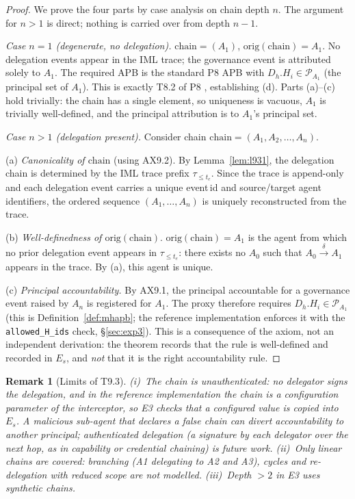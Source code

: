 \documentclass[11pt]{article}
\newtheorem{remark}{Remark}[section]
\newcommand{\Pset}{\mathcal{P}}
\newcommand{\Es}{E_s}
\newcommand{\Dh}{D_h}
\newcommand{\Hi}{H_i}
\newcommand{\delegateto}{\xrightarrow{\delta}}
\newcommand{\chain}{\mathrm{chain}}
\newcommand{\orig}{\mathrm{orig}}
\begin{document}
\begin{proof}
We prove the four parts by case analysis on chain depth $n$. The
argument for $n>1$ is direct; nothing is carried over from depth $n-1$.

\emph{Case $n = 1$ (degenerate, no delegation).}
$\chain = (A_1)$, $\orig(\chain) = A_1$.
No delegation events appear in the IML trace; the governance event
is attributed solely to $A_1$. The required APB is the standard P8
APB with $\Dh.\Hi \in \Pset_{A_1}$ (the principal set of $A_1$).
This is exactly T8.2 of P8 \citep{fernandez2026ibg}, establishing (d).
Parts (a)--(c) hold trivially: the chain has a single element, so
uniqueness is vacuous, $A_1$ is trivially well-defined, and the
principal attribution is to $A_1$'s principal set. \checkmark

\emph{Case $n > 1$ (delegation present).}
Consider chain $\chain = (A_1, A_2, \ldots, A_n)$.

(a) \emph{Canonicality of $\chain$} (using AX9.2).
By Lemma~\ref{lem:l931}, the delegation chain is determined by the
IML trace prefix $\tau_{\le t_e}$. Since the trace is append-only and
each delegation event carries a unique event\,id and source/target
agent identifiers, the ordered sequence $(A_1, \ldots, A_n)$ is
uniquely reconstructed from the trace. \checkmark

(b) \emph{Well-definedness of $\orig(\chain)$}.
$\orig(\chain) = A_1$ is the agent from which no prior delegation
event appears in $\tau_{\le t_e}$: there exists no $A_0$ such
that $A_0 \delegateto A_1$ appears in the trace.
By (a), this agent is unique. \checkmark

(c) \emph{Principal accountability.}
By AX9.1, the principal accountable for a governance event raised by
$A_n$ is registered for $A_1$. The proxy therefore requires
$\Dh.\Hi \in \Pset_{A_1}$ (this is Definition~\ref{def:mhapb}; the
reference implementation enforces it with the
\texttt{allowed\_H\_ids} check, \S\ref{sec:exp3}). This is a
consequence of the axiom, not an independent derivation: the theorem
records that the rule is well-defined and recorded in $\Es$, and
\emph{not} that it is the right accountability rule. \checkmark
\end{proof}

\begin{remark}[Limits of T9.3]
(i)~The chain is \emph{unauthenticated}: no delegator signs the
delegation, and in the reference implementation the chain is a
configuration parameter of the interceptor, so E3 checks that a
configured value is copied into $\Es$. A malicious sub-agent that
declares a false chain can divert accountability to another principal;
authenticated delegation (a signature by each delegator over the next
hop, as in capability or credential chaining) is future work. (ii)~Only
linear chains are covered: branching (A1 delegating to A2 and A3),
cycles and re-delegation with reduced scope are not modelled.
(iii)~Depth $>2$ in E3 uses synthetic chains.
\end{remark}
\end{document}
